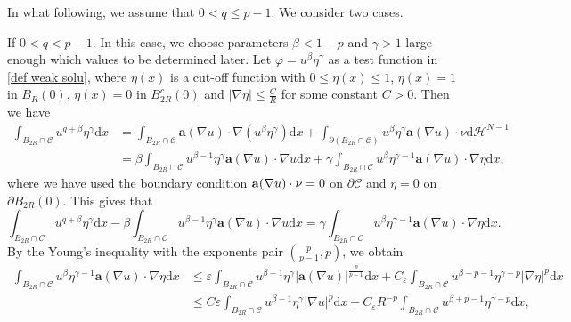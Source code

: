 \documentclass[12pt]{amsart}
\theoremstyle{definition}
\theoremstyle{remark}
\theoremstyle{conclusion}
\theoremstyle{conjecture}
\numberwithin{equation}{section}
\begin{document}
In what following, we assume that $0<q\leq p-1$. We consider two cases.

\smallskip

 If $0<q<p-1$. In this case, we choose parameters $\beta<1-p$ and $\gamma>1$ large enough which values to be determined later. Let $\varphi=u^{\beta}\eta^{\gamma}$ as a test function in \eqref{def weak solu}, where $\eta(x)$ is a cut-off function with $0\leq\eta(x)\leq1$, $\eta(x)=1$ in $B_R(0)$, $\eta(x)=0$ in $B^c_{2R}(0)$ and $|\nabla\eta|\leq\frac{C}{R}$ for some constant $C>0$.
Then we have
\begin{equation*}
  \begin{aligned}
    \int_{B_{2R}\cap\mathcal{C}}u^{q+\beta}\eta^{\gamma}\mathrm{d}x
    &=\int_{B_{2R}\cap\mathcal{C}}{\mathbf{a}}(\nabla u)\cdot\nabla(u^{\beta}\eta^{\gamma})\mathrm{d}x+\int_{\partial(B_{2R}\cap\mathcal{C})}u^{\beta}\eta^{\gamma}{\mathbf{a}}(\nabla u)\cdot\nu\mathrm{d}\mathcal{H}^{N-1}\\
    &=\beta\int_{B_{2R}\cap\mathcal{C}}u^{\beta-1}\eta^{\gamma}{\mathbf{a}}(\nabla u)\cdot\nabla u\mathrm{d}x+\gamma\int_{B_{2R}\cap\mathcal{C}}u^{\beta}\eta^{\gamma-1}{\mathbf{a}}(\nabla u)\cdot\nabla \eta\mathrm{d}x,
  \end{aligned}
\end{equation*}
where we have used the boundary condition ${\bf{a}}(\nabla u)\cdot\nu=0$ on $\partial\mathcal{C}$ and $\eta=0$ on $\partial B_{2R}(0)$. This gives that
\begin{equation}\label{eq4.18}
  \int_{B_{2R}\cap\mathcal{C}}u^{q+\beta}\eta^{\gamma}\mathrm{d}x-\beta\int_{B_{2R}\cap\mathcal{C}}u^{\beta-1}\eta^{\gamma}{\mathbf{a}}(\nabla u)\cdot\nabla u\mathrm{d}x=\gamma\int_{B_{2R}\cap\mathcal{C}}u^{\beta}\eta^{\gamma-1}{\mathbf{a}}(\nabla u)\cdot\nabla \eta\mathrm{d}x.
\end{equation}
By the Young's inequality with the exponents pair $(\frac{p}{p-1},p)$, we obtain
\begin{equation*}\label{eq4.19}
  \begin{aligned}
    \int_{B_{2R}\cap\mathcal{C}}u^{\beta}\eta^{\gamma-1}{\mathbf{a}}(\nabla u)\cdot\nabla \eta\mathrm{d}x
    &\leq \varepsilon\int_{B_{2R}\cap\mathcal{C}}u^{\beta-1}\eta^{\gamma}|{\mathbf{a}}(\nabla u)|^{\frac{p}{p-1}}\mathrm{d}x+C_{\varepsilon}\int_{B_{2R}\cap\mathcal{C}}u^{\beta+p-1}\eta^{\gamma-p}|\nabla \eta|^p\mathrm{d}x\\
    &\leq C\varepsilon\int_{B_{2R}\cap\mathcal{C}}u^{\beta-1}\eta^{\gamma}|\nabla u|^{p}\mathrm{d}x+C_{\varepsilon}R^{-p}\int_{B_{2R}\cap\mathcal{C}}u^{\beta+p-1}\eta^{\gamma-p}\mathrm{d}x,
  \end{aligned}
\end{equation*}
\end{document}
